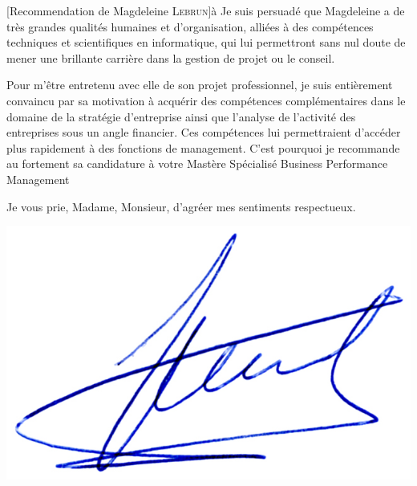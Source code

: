 \documentclass[a4paper,10pt]{article}
\begin{document}
\begin{letter}[Recommendation de Magdeleine \textsc{Lebrun}]{à}
Je  suis  persuadé que  Magdeleine  a  de  très  grandes qualités  humaines  et
d'organisation,  alliées  à  des  compétences  techniques  et  scientifiques  en
informatique, qui lui permettront sans nul doute de mener une brillante carrière
dans la gestion de projet ou le conseil.

Pour m'être entretenu avec elle de son projet professionnel, je suis entièrement
convaincu par sa  motivation à acquérir des compétences  complémentaires dans le
domaine  de la  stratégie d'entreprise  ainsi  que l'analyse  de l'activité  des
entreprises sous un angle financier. Ces compétences lui permettraient d'accéder
plus rapidement à  des fonctions de management. C'est pourquoi  je recommande au
fortement  sa candidature à votre Mastère  Spécialisé Business Performance
Management


Je vous prie, Madame, Monsieur, d'agréer mes sentiments respectueux.

\end{letter}
\begin{flushright}
\includegraphics[width=.2\textwidth]{signgenaud.jpg}
\end{flushright}
\end{document}
